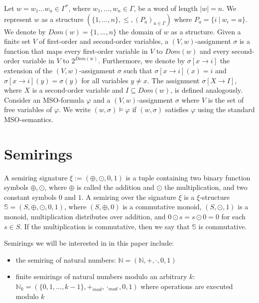 \documentclass[en]{pracamgr}
\theoremstyle{definition}
\begin{document}
Let $w = w_1\ldots w_n \in \Gamma^*$, where $w_1,\ldots,w_n \in \Gamma$, be a word of length $|w| = n$. We represent $w$ as a structure $(\{1,\ldots,n\}, \leq, (P_a)_{a \in \Gamma})$ where $P_a = \{i \ | \ w_i = a\}$. We denote by $Dom(w) = \{1,\ldots,n\}$ the domain of $w$ as a structure. Given a finite set $V$ of first-order and second-order variables, a $(V,w)$-assignment $\sigma$ is a function that maps every first-order variable in $V$ to $Dom(w)$ and every second-order variable in $V$ to $2^{Dom(w)}$. Furthermore, we denote by $\sigma[x \rightarrow i]$ the extension of the $(V,w)$-assignment $\sigma$ such that $\sigma[x \rightarrow i](x) = i$ and $\sigma[x \rightarrow i](y) = \sigma(y)$ for all variables $y \ne x$. The assignment $\sigma[X \rightarrow I]$, where $X$ is a second-order variable and $I \subseteq Dom(w)$, is defined analogously. Consider an MSO-formula $\varphi$ and a $(V,w)$-assignment $\sigma$ where $V$ is the set of free variables of $\varphi$. We write $(w, \sigma) \models \varphi$ if $(w, \sigma)$ satisfies $\varphi$ using the standard MSO-semantics.

\section{Semirings}

A semiring signature $\xi := (\oplus, \odot, 0, 1)$ is a tuple containing two binary function symbols $\oplus, \odot$, where $\oplus$ is called the addition and $\odot$ the multiplication, and two constant symbols $0$ and $1$. A semiring over the signature $\xi$ is a $\xi$-structure $\mathbb{S} = (S, \oplus, \odot, 0, 1)$, where $(S, \oplus, 0)$ is a commutative monoid, $(S, \odot, 1)$ is a monoid, multiplication distributes over addition, and $0 \odot s = s \odot 0 = 0$ for each $s \in S$. If the multiplication is commutative, then we say that $\mathbb{S}$ is commutative.

Semirings we will be interested in in this paper include:

\begin{itemize}
    \item the semiring of natural numbers: $\mathbb{N} = (\mathbb{N}, +, \cdot, 0, 1)$
    \item finite semirings of natural numbers modulo an arbitrary $k$: \\ $ \mathbb{N}_k = (\{0,1,\ldots,k-1\}, +_{mod}, \cdot_{mod}, 0, 1)$ where operations are executed modulo $k$
\end{itemize}
\end{document}
